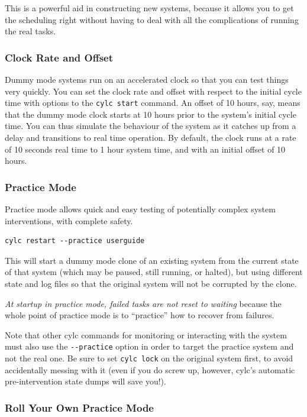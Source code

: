 \documentclass[11pt,a4paper]{article}
\begin{document}
This is a powerful aid in constructing new systems, because it allows
you to get the scheduling right without having to deal with all the
complications of running the real tasks.

\subsubsection{Clock Rate and Offset}

Dummy mode systems run on an accelerated clock so that you can test
things very quickly. You can set the clock rate and offset with respect
to the initial cycle time with options to the \lstinline=cylc start=
command. An offset of 10 hours, say, means that the dummy mode clock
starts at 10 hours prior to the system's initial cycle time.  You can
thus simulate the behaviour of the system as it catches up from a delay
and transitions to real time operation.  By default, the clock runs at a
rate of 10 seconds real time to 1 hour system time, and with an initial
offset of 10 hours. 

\subsubsection{Practice Mode}

Practice mode allows quick and easy testing of potentially complex
system interventions, with complete safety.

\begin{lstlisting}
cylc restart --practice userguide
\end{lstlisting}

This will start a dummy mode clone of an existing system from the
current state of that system (which may be paused, still running, or
halted), but using different state and log files so that the original
system will not be corrupted by the clone.

{\em At startup in practice mode, failed tasks are not reset to waiting}
because the whole point of practice mode is to ``practice'' how to
recover from failures.

Note that other cylc commands for monitoring or interacting with the
system must also use the \lstinline=--practice= option in order to
target the practice system and not the real one. Be sure to set
\lstinline=cylc lock= on the original system first, to avoid
accidentally messing with it (even if you do screw up, however, cylc's
automatic pre-intervention state dumps will save you!).


\subsubsection{Roll Your Own Practice Mode}
\end{document}
